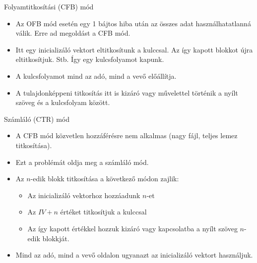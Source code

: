 \documentclass[12 pt]{beamer}
\begin{document}
\begin{frame}{Folyamtitkosítási (CFB) mód}
  \begin{itemize}
    \item{Az OFB mód esetén egy 1 bájtos hiba után az összes adat használhatatlanná válik. Erre ad megoldást a CFB mód.}
    \item{Itt egy inicializáló vektort eltitkosítunk a kulccsal. Az így kapott blokkot újra eltitkosítjuk. Stb. Így egy kulcsfolyamot kapunk.}
    \item{A kulcsfolyamot mind az adó, mind a vevő előállítja.}
    \item{A tulajdonképpeni titkosítás itt is kizáró vagy művelettel történik a nyílt szöveg és a kulcsfolyam között.}
  \end{itemize}

%
\end{frame}

\begin{frame}{Számláló (CTR) mód}
  \begin{itemize}
    \item{A CFB mód közvetlen hozzáférésre nem alkalmas (nagy fájl, teljes lemez titkosítása).}
    \item{Ezt a problémát oldja meg a számláló mód.}
    \item{Az $n$-edik blokk titkosítása a következő módon zajlik:}
      \begin{itemize}
        \item{Az inicializáló vektorhoz hozzáadunk $n$-et}
        \item{Az $IV + n$ értéket titkosítjuk a kulccsal}
        \item{Az így kapott értékkel hozzuk kizáró vagy kapcsolatba a nyílt szöveg $n$-edik blokkját.}
      \end{itemize}
    \item{Mind az adó, mind a vevő oldalon ugyanazt az inicializáló vektort használjuk.}
  \end{itemize}


\end{frame}
\end{document}

